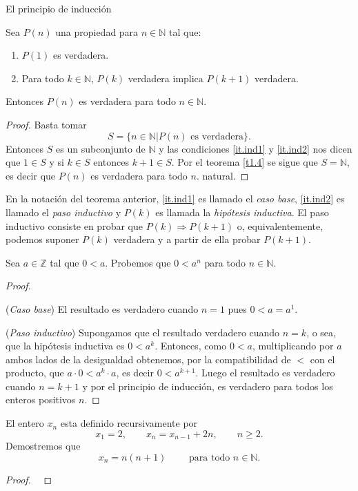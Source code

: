 \begin{section}{El principio de inducción}
\begin{teorema}\label{induccion2} Sea $P(n)$ una propiedad para $n \in \mathbb N$ tal que:
\begin{enumerate}[label=\textit{\alph*)}]
\item\label{it.ind1} $P(1)$ es verdadera.
\item\label{it.ind2} Para todo $k \in \mathbb N$, $P(k)$ verdadera implica $P(k + 1)$ verdadera.
\end{enumerate}
Entonces $P(n)$ es verdadera para todo $n \in \mathbb N$.
\end{teorema}
\begin{proof} Basta tomar
$$S = \{n \in \mathbb N| P(n) \text{ es verdadera} \}.$$
Entonces $S$ es un subconjunto de $\mathbb N$ y las condiciones \ref{it.ind1} y \ref{it.ind2} nos dicen que $1 \in S$ y  si $ k \in S$ entonces $k+1\in S$. Por el teorema \ref{t1.4} se sigue que $S= \mathbb N$, es decir que $P(n)$ es verdadera para todo $n$.
natural.
\end{proof}


En la notación del teorema anterior, \ref{it.ind1} es llamado  el {\em caso base}, \ref{it.ind2} es llamado el  {\em paso inductivo} y $P(k)$ es llamada la {\em hipótesis inductiva}. El paso inductivo  consiste en probar que $P(k) \Rightarrow P(k + 1)$ o, equivalentemente, podemos suponer $P(k)$ verdadera y a partir de ella probar $P(k + 1)$. 


\begin{ejemplo}\label{ejemplo141} Sea $a\in \mathbb Z$ tal que $0<a$. Probemos que $0<a^n$ para todo $n \in \mathbb N$.
\end{ejemplo}
\begin{proof}
\

\noindent (\textit{Caso  base}) El resultado es verdadero
cuando $n=1$ pues $ 0 < a=a^1$.

\noindent (\textit{Paso  inductivo})
 Supongamos que el resultado verdadero cuando $n=k$, o sea, que la hipótesis inductiva es $0 < a^k$. Entonces, como $0<a$, multiplicando por $a$ ambos lados de la desigualdad obtenemos, por la compatibilidad de $<$ con el producto, que $a\cdot 0 < a^k \cdot a$, es decir $0<a^{k+1}$.  Luego el resultado es verdadero cuando $n=k+1$ y por el principio de inducción, es verdadero para todos los enteros positivos $n$.
\end{proof}

\begin{ejemplo*} El entero $x_n$ esta definido recursivamente por
$$
x_1=2, \qquad x_n=x_{n-1} +2n, \qquad n\ge 2.
$$
Demostremos que
$$
x_n = n(n+1) \qquad \text{ para todo } n\in \mathbb N.
$$
\end{ejemplo*}
\begin{proof}
\    


\end{proof}
\end{section}
